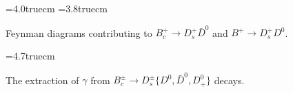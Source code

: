 \documentclass[11pt]{cernrep}
\begin{document}
\begin{figure}
\begin{center}
\leavevmode
\epsfysize=4.0truecm 
 \hspace*{1truecm}
\epsfysize=3.8truecm 
\end{center}
\vspace*{-0.4truecm}
\caption{Feynman diagrams contributing to $B^+_c\to D_s^+\bar D^0$ and 
$B^+\to D_s^+D^0$. }\label{fig:BcDsD}
\end{figure}


\begin{figure}
\vspace*{0.3truecm}
\begin{center}
\leavevmode
\epsfysize=4.7truecm 
\end{center}
\vspace*{-0.6truecm}
\caption{The extraction of $\gamma$ from 
$B_c^\pm\to D^\pm_s\{D^0,\bar D^0,D^0_+\}$ decays.}\label{fig:triangles}
\end{figure}
\end{document}
